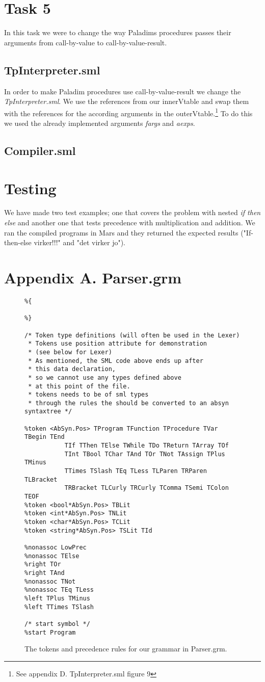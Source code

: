 \documentclass[12pt,a4paper,english]{article}
\begin{document}
\section{Task 5}
In this task we were to change the way Paladims procedures passes their arguments from call-by-value to call-by-value-result.
\subsection{TpInterpreter.sml}
In order to make Paladim procedures use call-by-value-result we change the \textit{TpInterpreter.sml}. We use the references from our innerVtable and swap them with the references for the according arguments in the outerVtable.\footnote{See appendix D. TpInterpreter.sml figure 9} To do this we used the already implemented arguments \textit{fargs} and \textit{aexps}.

\subsection{Compiler.sml}


\newpage
\section{Testing}
We have made two test examples; one that covers the problem with nested \textit{if then else} and another one that tests precedence with multiplication and addition. We ran the compiled programs in Mars and they returned the expected results ("If-then-else virker!!!" and "det virker jo").
\newpage

\section{Appendix A. Parser.grm}
\begin{figure}[h]
\begin{lstlisting}
%{ 
   
%}

/* Token type definitions (will often be used in the Lexer)
 * Tokens use position attribute for demonstration 
 * (see below for Lexer)
 * As mentioned, the SML code above ends up after
 * this data declaration,
 * so we cannot use any types defined above
 * at this point of the file.
 * tokens needs to be of sml types
 * through the rules the should be converted to an absyn syntaxtree */

%token <AbSyn.Pos> TProgram TFunction TProcedure TVar TBegin TEnd 
		   TIf TThen TElse TWhile TDo TReturn TArray TOf 
		   TInt TBool TChar TAnd TOr TNot TAssign TPlus TMinus 
		   TTimes TSlash TEq TLess TLParen TRParen TLBracket 
		   TRBracket TLCurly TRCurly TComma TSemi TColon TEOF
%token <bool*AbSyn.Pos> TBLit
%token <int*AbSyn.Pos> TNLit
%token <char*AbSyn.Pos> TCLit
%token <string*AbSyn.Pos> TSLit TId

%nonassoc LowPrec
%nonassoc TElse
%right TOr
%right TAnd
%nonassoc TNot
%nonassoc TEq TLess
%left TPlus TMinus
%left TTimes TSlash

/* start symbol */
%start Program
\end{lstlisting}
\caption{The tokens and precedence rules for our grammar in Parser.grm.}\end{figure}
\end{document}
